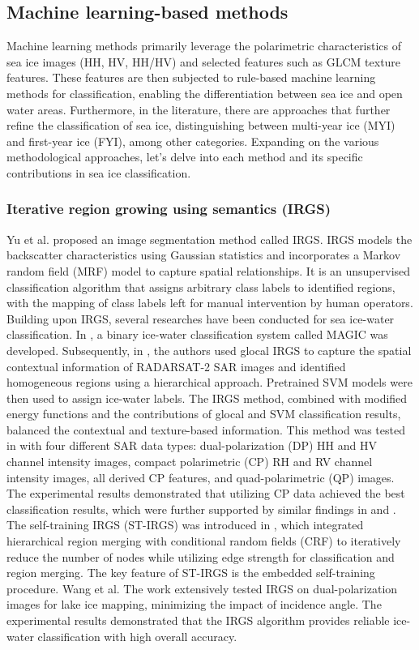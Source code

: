 \subsection {Machine learning-based methods}
Machine learning methods primarily leverage the polarimetric characteristics of sea ice images (HH, HV, HH/HV) and selected features such as GLCM texture features. These features are then subjected to rule-based machine learning methods for classification, enabling the differentiation between sea ice and open water areas. Furthermore, in the literature, there are approaches that further refine the classification of sea ice, distinguishing between multi-year ice (MYI) and first-year ice (FYI), among other categories. Expanding on the various methodological approaches, let's delve into each method and its specific contributions in sea ice classification.


\subsubsection{Iterative region growing using semantics (IRGS)}
Yu et al. \cite{4lohse2020mapping} proposed an image segmentation method called IRGS. IRGS \cite{17yu2008irgs} models the backscatter characteristics using Gaussian statistics and incorporates a Markov random field (MRF) model to capture spatial relationships. It is an unsupervised classification algorithm that assigns arbitrary class labels to identified regions, with the mapping of class labels left for manual intervention by human operators. Building upon IRGS, several researches have been conducted for sea ice-water classification. In \cite{18clausi2010magic}, a binary ice-water classification system called MAGIC was developed. Subsequently, in \cite{19leigh2013automated}, the authors used glocal IRGS to capture the spatial contextual information of RADARSAT-2 SAR images and identified homogeneous regions using a hierarchical approach. Pretrained SVM models were then used to assign ice-water labels. The IRGS method, combined with modified energy functions and the contributions of glocal and SVM classification results, balanced the contextual and texture-based information. This method was tested in \cite{22ghanbari2019contextual} with four different SAR data types: dual-polarization (DP) HH and HV channel intensity images, compact polarimetric (CP) RH and RV channel intensity images, all derived CP features, and quad-polarimetric (QP) images. The experimental results demonstrated that utilizing CP data achieved the best classification results, which were further supported by similar findings in \cite{24-9324618} and \cite{25ghanbari2021cp}. The self-training IRGS (ST-IRGS) was introduced in \cite{20li2015semi}, which integrated hierarchical region merging with conditional random fields (CRF) to iteratively reduce the number of nodes while utilizing edge strength for classification and region merging. The key feature of ST-IRGS is the embedded self-training procedure. Wang et al. The work \cite{21wang2018semi} extensively tested IRGS on dual-polarization images for lake ice mapping, minimizing the impact of incidence angle. The experimental results demonstrated that the IRGS algorithm provides reliable ice-water classification with high overall accuracy.

